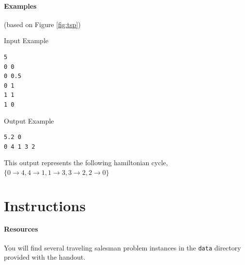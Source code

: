 \documentclass[11pt]{article}
\begin{document}
\paragraph{Examples} \mbox{}
(based on Figure \ref{fig:tsp})

\vspace{0.2cm}
\noindent
Input Example
\vspace{-0.2cm}
\begin{Verbatim}[frame=single]
5
0 0
0 0.5
0 1
1 1
1 0
\end{Verbatim}

\vspace{0.2cm}
\noindent
Output Example
\vspace{-0.2cm}
\begin{Verbatim}[frame=single]
5.2 0
0 4 1 3 2
\end{Verbatim}
%
This output represents the following hamiltonian cycle, $\{0 \rightarrow 4, 4 \rightarrow 1, 1 \rightarrow 3, 3 \rightarrow 2, 2 \rightarrow 0\}$

\section{Instructions}




\paragraph{Resources}
You will find several  traveling salesman problem instances in the \texttt{data} directory provided with the handout.












 

\end{document}
